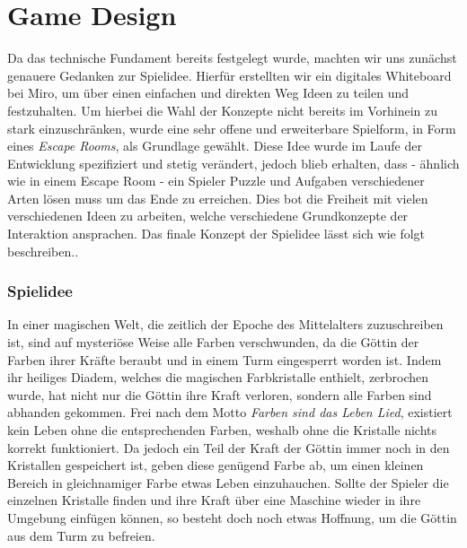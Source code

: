 \chapter{Game Design}
Da das technische Fundament bereits festgelegt wurde, machten wir uns zunächst genauere Gedanken zur Spielidee. Hierfür erstellten wir ein digitales Whiteboard bei Miro, um über einen einfachen und direkten Weg Ideen zu teilen und festzuhalten. Um hierbei die Wahl der Konzepte nicht bereits im Vorhinein zu stark einzuschränken, wurde eine sehr offene und erweiterbare Spielform, in Form eines \textit{Escape Rooms}, als Grundlage gewählt. Diese Idee wurde im Laufe der Entwicklung spezifiziert und stetig verändert, jedoch blieb erhalten, dass - ähnlich wie in einem Escape Room - ein Spieler Puzzle und Aufgaben verschiedener Arten lösen muss um das Ende zu erreichen. Dies bot die Freiheit mit vielen verschiedenen Ideen zu arbeiten, welche verschiedene Grundkonzepte der Interaktion ansprachen. Das finale Konzept der Spielidee lässt sich wie folgt beschreiben..\\
\subsection{Spielidee}
In einer magischen Welt, die zeitlich der Epoche des Mittelalters zuzuschreiben ist, sind auf mysteriöse Weise alle Farben verschwunden, da die Göttin der Farben ihrer Kräfte beraubt und in einem Turm eingesperrt worden ist. Indem ihr heiliges Diadem, welches die magischen Farbkristalle enthielt, zerbrochen wurde, hat nicht nur die Göttin ihre Kraft verloren, sondern alle Farben sind abhanden gekommen. Frei nach dem Motto \textit{Farben sind das Leben Lied}, existiert kein Leben ohne die entsprechenden Farben, weshalb ohne die Kristalle nichts korrekt funktioniert. Da jedoch ein Teil der Kraft der Göttin immer noch in den Kristallen gespeichert ist, geben diese genügend Farbe ab, um einen kleinen Bereich in gleichnamiger Farbe etwas Leben einzuhauchen. Sollte der Spieler die einzelnen Kristalle finden und ihre Kraft über eine Maschine wieder in ihre Umgebung einfügen können, so besteht doch noch etwas Hoffnung, um die Göttin aus dem Turm zu befreien.\\
